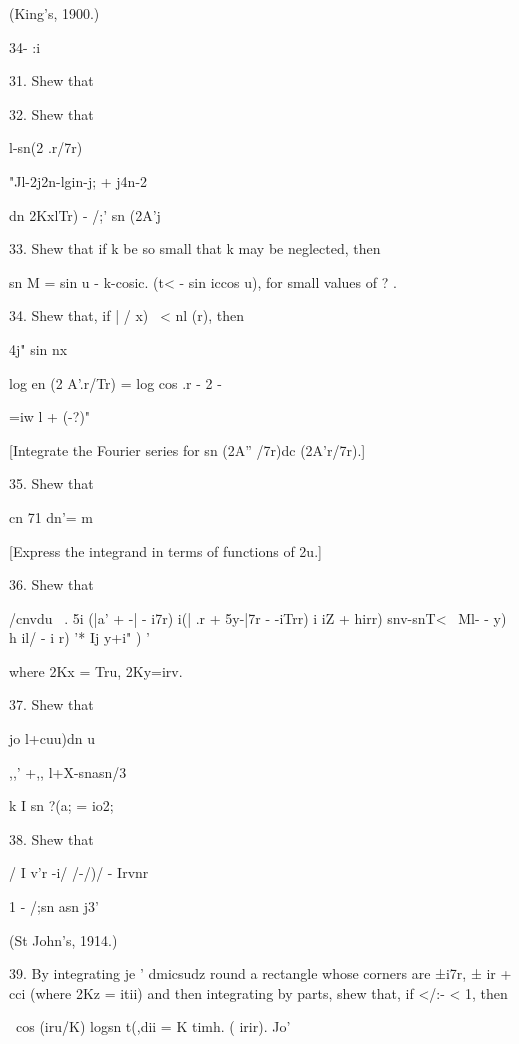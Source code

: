 (King's, 1900.)

34- :i

%
%

31. Shew that


32. Shew that

l-sn(2 .r/7r)

"Jl-2j2n-lgin-j; + j4n-2

 dn 2KxlTr) - /;' sn (2A'j


33. Shew that if k be so small that k may be neglected, then

sn M = sin u - k-cosic. (t< - sin iccos u), for small values of ? .

34. Shew that, if | / x) \ < nl (r), then

4j" sin nx

log en (2 A'.r/Tr) = log cos .r - 2 -

 =iw l + (-?)"

 [Integrate the Fourier series for sn (2A'' /7r)dc
(2A'r/7r).]

35. Shew that

cn 71 dn'= m

 [Express the integrand in terms of functions of
2u.]

36. Shew that

/cnvdu \ . 5i (|a' + -| - i7r) i(| .r + 5y-|7r - -iTrr) i iZ + hirr)
snv-snT<~ Ml- - y) h il/ - i r) '* Ij y+i" ) '

where 2Kx = Tru, 2Ky=irv. 

37. Shew that

  jo l+cuu)dn u


,,' +,, l+X-snasn/3

k I sn ?(a; = io2;

38. Shew that

/ I v'r -i/ /-/)/ - Irvnr

1 - /;sn asn j3'

(St John's, 1914.)

39. By integrating je ' dmicsudz round a rectangle whose corners are
±i7r, ± ir + cci (where 2Kz = itii) and then integrating by parts,
shew that, if </:- < 1, then

\ cos (iru/K) logsn t(,dii = K timh. ( irir). Jo'

